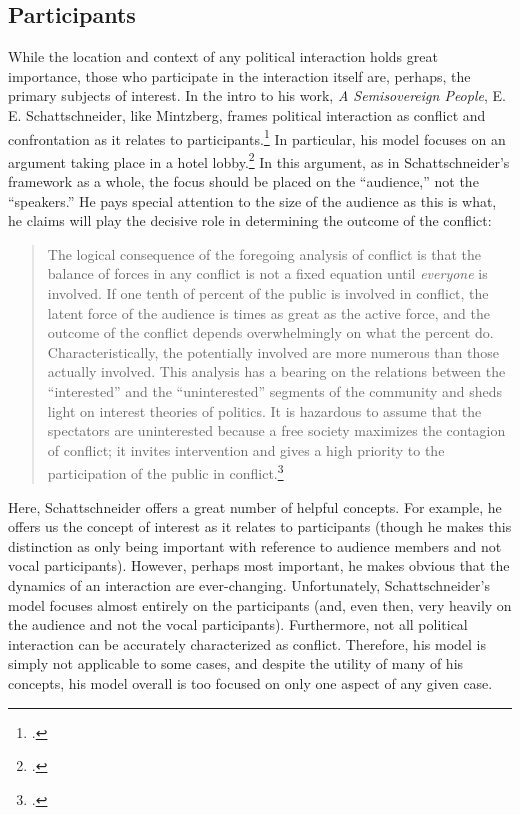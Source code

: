 \documentclass{article}
\begin{document}
\subsection{Participants}
While the location and context of any political interaction holds great importance, those who participate in the interaction itself are, perhaps, the primary subjects of interest. 
In the intro to his work, \emph{A Semisovereign People}, E. E. Schattschneider, like Mintzberg, frames political interaction as conflict and confrontation as it relates to participants.\footcite{schattschneider75} 
In particular, his model focuses on an argument taking place in a hotel lobby.\footcite[1--5. Ironically, despite mentioning the location of the conflict, Schattschneider fails to discuss how the location may have affected the interaction.]{schattschneider75} 
In this argument, as in Schattschneider's framework as a whole, the focus should be placed on the ``audience,'' not the ``speakers.'' 
He pays special attention to the size of the audience as this is what, he claims will play the decisive role in determining the outcome of the conflict: 
\blockquote{The logical consequence of the foregoing analysis of conflict is that the balance of forces in any conflict is not a fixed equation until \emph{everyone} is involved. If one tenth of  percent of the public is involved in conflict, the latent force of the audience is  times as great as the active force, and the outcome of the conflict depends overwhelmingly on what the  percent do. Characteristically, the potentially involved are more numerous than those actually involved. This analysis has a bearing on the relations between the ``interested'' and the ``uninterested'' segments of the community and sheds light on interest theories of politics. It is hazardous to assume that the spectators are uninterested because a free society maximizes the contagion of conflict; it invites intervention and gives a high priority to the participation of the public in conflict.\footcite[5]{schattschneider75}}
Here, Schattschneider offers a great number of helpful concepts. 
For example, he offers us the concept of interest as it relates to participants (though he makes this distinction as only being important with reference to audience members and not vocal participants). 
However, perhaps most important, he makes obvious that the dynamics of an interaction are ever-changing. 
Unfortunately, Schattschneider's model focuses almost entirely on the participants (and, even then, very heavily on the audience and not the vocal participants). 
Furthermore, not all political interaction can be accurately characterized as conflict. 
Therefore, his model is simply not applicable to some cases, and despite the utility of many of his concepts, his model overall is too focused on only one aspect of any given case.
\end{document}
